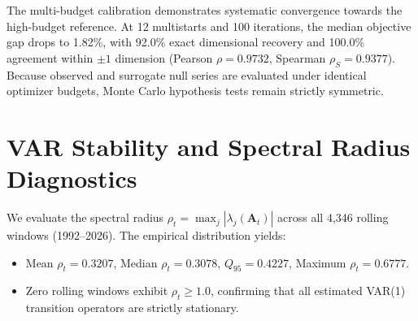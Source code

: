 \documentclass[12pt]{article}
\begin{document}
\begin{table}[htbp]
\centering
\caption{Optimizer Budget Calibration Diagnostic on Selection Objective $J(q^*)$: Candidate Configurations vs. High-Budget Reference (25/150)}
\label{tab:app_optimizer_convergence}
\end{table}

The multi-budget calibration demonstrates systematic convergence towards the high-budget reference. At 12 multistarts and 100 iterations, the median objective gap drops to 1.82\%, with 92.0\% exact dimensional recovery and 100.0\% agreement within $\pm 1$ dimension (Pearson $\rho = 0.9732$, Spearman $\rho_S = 0.9377$). Because observed and surrogate null series are evaluated under identical optimizer budgets, Monte Carlo hypothesis tests remain strictly symmetric.

\section{VAR Stability and Spectral Radius Diagnostics}
\label{app:spectral_radius}

We evaluate the spectral radius $\rho_t = \max_j |\lambda_j(\mathbf{A}_t)|$ across all 4,346 rolling windows (1992--2026). The empirical distribution yields:
\begin{itemize}
    \item Mean $\rho_t = 0.3207$, Median $\rho_t = 0.3078$, $Q_{95} = 0.4227$, Maximum $\rho_t = 0.6777$.
    \item Zero rolling windows exhibit $\rho_t \ge 1.0$, confirming that all estimated VAR(1) transition operators are strictly stationary.
\end{itemize}
\end{document}
